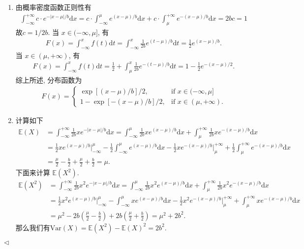 \documentclass[11pt]{article}
\newenvironment{answer}[1][Solution]{\begin{trivlist}
    \item[\hskip \labelsep {\bfseries #1.}\hskip \labelsep]}{\hfill$\lhd$\end{trivlist}}
\newcommand\1{\mathds{1}}
\newcommand\E{\mathbb{E}}
\newcommand\dd{\mathrm{d}}
\newcommand\Var{\mathrm{Var}}
\begin{document}
\begin{answer}
    \begin{enumerate}[label = (\arabic*)]
        \item 由概率密度函数正则性有
        \begin{align*}
            \int_{-\infty}^{+\infty}c\cdot e^{-|x-\mu|/b} \dd x = c\cdot \int_{-\infty}^{\mu} e^{(x-\mu)/b} \dd x + c\cdot\int_{\mu}^{+\infty} e^{-(x-\mu)/b} \dd x = 2bc = 1
        \end{align*}
        故$c = 1/2b$. 当 $x\in(-\infty, \mu]$, 有
        \begin{align*}
            F(x) = \int_{-\infty}^{x} f(t)\dd t = \int_{-\infty}^{x} \frac{1}{2b} e^{(t-\mu)/b}\dd t = \frac{1}{2} e^{(x-\mu)/b}.
        \end{align*}
        当 $x\in (\mu, +\infty)$, 有
        \begin{align*}
            F(x) = \int_{-\infty}^{x} f(t)\dd t = \frac{1}{2} + \int_{\mu}^{x} \frac{1}{2b} e^{-(t-\mu)/b}\dd t = 1 - \frac{1}{2} e^{-(x-\mu)/2}.
        \end{align*}
        综上所述, 分布函数为
        \begin{align*}
            F(x) = \begin{cases}
                \exp[(x-\mu)/b] / 2, &\text{if }  x\in (-\infty, \mu] \\
                1 - \exp[-(x-\mu)/b] / 2, &\text{if } x \in(\mu, +\infty).
            \end{cases}
        \end{align*}
        \item 计算如下\begin{align*}
            \E(X) &= \int_{-\infty}^{+\infty} \frac{1}{2b}xe^{-|x-\mu|/b}\dd x = \int_{-\infty}^{\mu}\frac{1}{2b}xe^{(x-\mu)/b}\dd x + \int_{\mu}^{+\infty}\frac{1}{2b}xe^{-(x-\mu)/b}\dd x \\
            &= \frac{1}{2}xe^{(x-\mu)/b}\bigg|_{-\infty}^{\mu} - \frac{1}{2}\int_{-\infty}^{\mu}e^{(x-\mu)/b}\dd x - \frac{1}{2}xe^{-(x-\mu)/b}\bigg|_{\mu}^{+\infty} + \frac{1}{2}\int_{\mu}^{+\infty}e^{-(x-\mu)/b}\dd x \\
            &= \frac{\mu}{2} - \frac{b}{2} + \frac{\mu}{2} + \frac{b}{2} = \mu.
        \end{align*}
        下面来计算 $\E(X^2)$. 
        \begin{align*}
            \E(X^2) &= \int_{-\infty}^{+\infty} \frac{1}{2b}x^2e^{-|x-\mu|/b}\dd x = \int_{-\infty}^{\mu}\frac{1}{2b}x^2e^{(x-\mu)/b}\dd x + \int_{\mu}^{+\infty}\frac{1}{2b}x^2e^{-(x-\mu)/b}\dd x \\
            &= \frac{1}{2}x^2e^{(x-\mu)/b}\bigg|_{-\infty}^{\mu} - \int_{-\infty}^{\mu}xe^{(x-\mu)/b}\dd x - \frac{1}{2}x^2e^{-(x-\mu)/b}\bigg|_{\mu}^{+\infty} + \int_{\mu}^{+\infty}xe^{-(x-\mu)/b}\dd x \\ 
            &= \mu^2 - 2b\left(\frac{\mu}{2} - \frac{b}{2}\right) + 2b\left(\frac{\mu}{2} + \frac{b}{2}\right) = \mu^2 + 2b^2.
        \end{align*}
        那么我们有$\Var(X) = \E(X^2) - \E(X)^2 = 2b^2.$
    \end{enumerate}
\end{answer}
\end{document}
